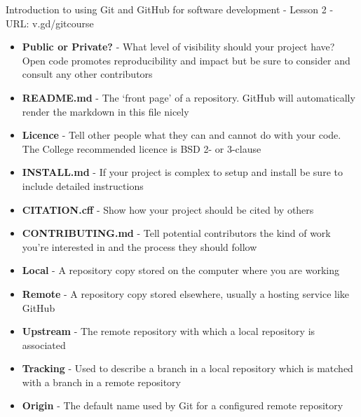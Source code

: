 \documentclass[10pt]{extarticle}
\def\itempad{0pt}
\begin{document}
\thispagestyle{empty}

\begin{center}
  {\Large
  Introduction to using Git and GitHub for software development - Lesson 2 - URL: v.gd/gitcourse}
\end{center}

\begin{navybox}[title=Things to think about when publishing code]
  \begin{itemize}
    \itemsep\itempad
  \item \textbf{Public or Private?} - What level of visibility should your
    project have? Open code promotes reproducibility and impact but be sure
    to consider and consult any other contributors
  \item \textbf{README.md} - The `front page' of a repository. GitHub will
    automatically render the markdown in this file nicely
  \item \textbf{Licence} - Tell other people what they can and cannot do with
    your code. The College recommended licence is BSD 2- or 3-clause
  \item \textbf{INSTALL.md} - If your project is complex to setup and install be
    sure to include detailed instructions
  \item \textbf{CITATION.cff} - Show how your project should be cited by others
  \item \textbf{CONTRIBUTING.md} - Tell potential contributors the kind of work
    you're interested in and the process they should follow
  \end{itemize}
\end{navybox}

\begin{bluebox}[title=Git Glossary]
  \begin{itemize}
      \itemsep\itempad
    \item \textbf{Local} - A repository copy stored on the computer where you
      are working
    \item \textbf{Remote} - A repository copy stored elsewhere, usually a
      hosting service like GitHub
    \item \textbf{Upstream} - The remote repository with which a local
      repository is associated
    \item \textbf{Tracking} - Used to describe a branch in a local repository
      which is matched with a branch in a remote repository
    \item \textbf{Origin} - The default name used by Git for a configured remote
      repository
  \end{itemize}
\end{bluebox}
\end{document}
